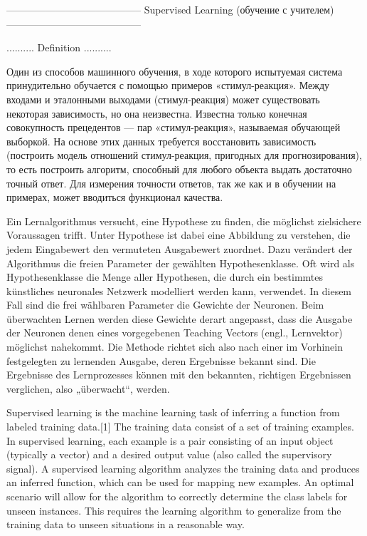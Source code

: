 -----------------------------------------
Supervised Learning (обучение с учителем)
-----------------------------------------

..........
Definition
..........

Один из способов машинного обучения, в ходе которого испытуемая система принудительно обучается с помощью примеров «стимул-реакция». Между входами и эталонными выходами (стимул-реакция) может существовать некоторая зависимость, но она неизвестна. Известна только конечная совокупность прецедентов — пар «стимул-реакция», называемая обучающей выборкой. На основе этих данных требуется восстановить зависимость (построить модель отношений стимул-реакция, пригодных для прогнозирования), то есть построить алгоритм, способный для любого объекта выдать достаточно точный ответ. Для измерения точности ответов, так же как и в обучении на примерах, может вводиться функционал качества.

Ein Lernalgorithmus versucht, eine Hypothese zu finden, die möglichst zielsichere Voraussagen trifft. Unter Hypothese ist dabei eine Abbildung zu verstehen, die jedem Eingabewert den vermuteten Ausgabewert zuordnet. Dazu verändert der Algorithmus die freien Parameter der gewählten Hypothesenklasse. Oft wird als Hypothesenklasse die Menge aller Hypothesen, die durch ein bestimmtes künstliches neuronales Netzwerk modelliert werden kann, verwendet. In diesem Fall sind die frei wählbaren Parameter die Gewichte der Neuronen. Beim überwachten Lernen werden diese Gewichte derart angepasst, dass die Ausgabe der Neuronen denen eines vorgegebenen Teaching Vectors (engl., Lernvektor) möglichst nahekommt. Die Methode richtet sich also nach einer im Vorhinein festgelegten zu lernenden Ausgabe, deren Ergebnisse bekannt sind. Die Ergebnisse des Lernprozesses können mit den bekannten, richtigen Ergebnissen verglichen, also „überwacht“, werden.

Supervised learning is the machine learning task of inferring a function from labeled training data.[1] The training data consist of a set of training examples. In supervised learning, each example is a pair consisting of an input object (typically a vector) and a desired output value (also called the supervisory signal). A supervised learning algorithm analyzes the training data and produces an inferred function, which can be used for mapping new examples. An optimal scenario will allow for the algorithm to correctly determine the class labels for unseen instances. This requires the learning algorithm to generalize from the training data to unseen situations in a reasonable way.

